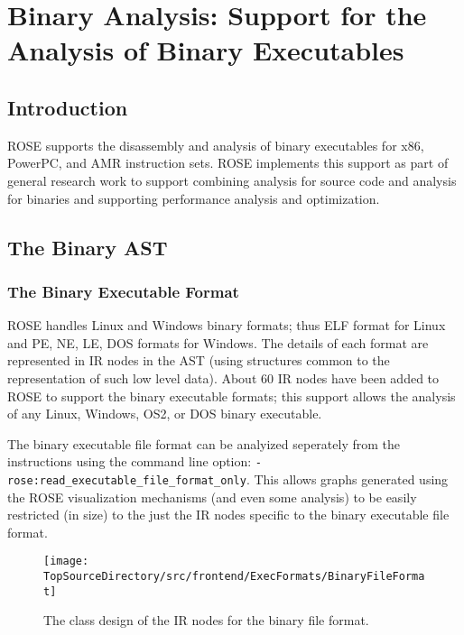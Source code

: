 
\chapter{Binary Analysis: Support for the Analysis of Binary Executables}

\label{binaryAnalysis::overview}

\section{Introduction}

   ROSE supports the disassembly and analysis of binary executables for x86, PowerPC, and AMR
instruction sets.  ROSE implements this support as part of general research work
to support combining analysis for source code and analysis for binaries and supporting
performance analysis and optimization.

\section{The Binary AST}

\subsection{The Binary Executable Format}

    ROSE handles Linux and Windows binary formats; thus ELF format for Linux and PE, NE,
LE, DOS formats for Windows.  The details of each format are represented in IR nodes in
the AST (using structures common to the representation of such low level data).  About
60 IR nodes have been added to ROSE to support the binary executable formats; this
support allows the analysis of any Linux, Windows, OS\/2, or DOS binary executable.

   The binary executable file format can be analyized seperately from the instructions
using the command line option: {\tt -rose:read\_executable\_file\_format\_only}.  This
allows graphs generated using the ROSE visualization mechanisms (and even some analysis) 
to be easily restricted (in size) to the just the IR nodes specific to the binary
executable file format.


\begin{figure}
\texttt{[image: \\TopSourceDirectory/src/frontend/ExecFormats/BinaryFileFormat]}
\caption{The class design of the IR nodes for the binary file format.} 

\label{binaryAnalysis:BinaryExecutableFormatDesign}
\end{figure}

